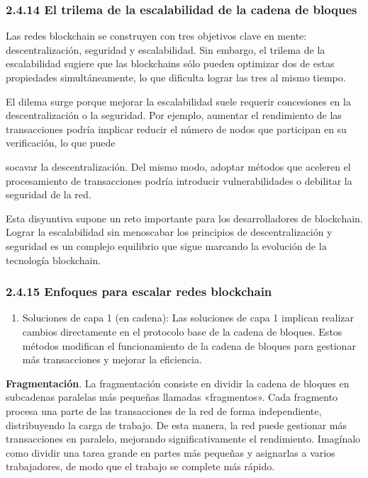 \documentclass[12pt,a4paper]{article}
\begin{document}
\subsubsection*{2.4.14 El trilema de la escalabilidad de la cadena de bloques}

Las redes blockchain se construyen con tres objetivos clave en mente: descentralización,
seguridad y escalabilidad. Sin embargo, el trilema de la escalabilidad sugiere que las
blockchains sólo pueden optimizar dos de estas propiedades simultáneamente, lo que
dificulta lograr las tres al mismo tiempo.

El dilema surge porque mejorar la escalabilidad suele requerir concesiones en la
descentralización o la seguridad. Por ejemplo, aumentar el rendimiento de las transacciones
podría implicar reducir el número de nodos que participan en su verificación, lo que puede

socavar la descentralización. Del mismo modo, adoptar métodos que aceleren el
procesamiento de transacciones podría introducir vulnerabilidades o debilitar la seguridad
de la red.

Esta disyuntiva supone un reto importante para los desarrolladores de blockchain. Lograr la
escalabilidad sin menoscabar los principios de descentralización y seguridad es un complejo
equilibrio que sigue marcando la evolución de la tecnología blockchain.

\subsubsection*{2.4.15 Enfoques para escalar redes blockchain}

\begin{enumerate}[label=\alph*.]
    \item Soluciones de capa 1 (en cadena): Las soluciones de capa 1 implican realizar
    cambios directamente en el protocolo base de la cadena de bloques. Estos métodos
    modifican el funcionamiento de la cadena de bloques para gestionar más
    transacciones y mejorar la eficiencia.
\end{enumerate}

\textbf{Fragmentación}. La fragmentación consiste en dividir la cadena de bloques en subcadenas
paralelas más pequeñas llamadas «fragmentos». Cada fragmento procesa una parte de las
transacciones de la red de forma independiente, distribuyendo la carga de trabajo. De esta
manera, la red puede gestionar más transacciones en paralelo, mejorando
significativamente el rendimiento. Imagínalo como dividir una tarea grande en partes más
pequeñas y asignarlas a varios trabajadores, de modo que el trabajo se complete más
rápido.
\end{document}
